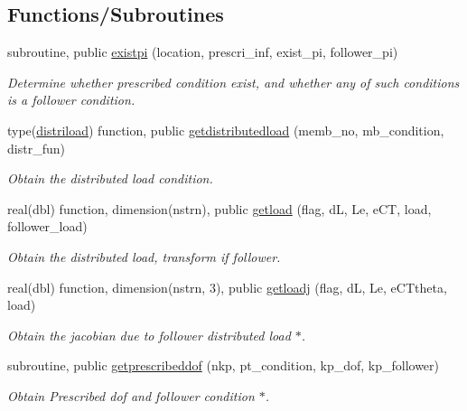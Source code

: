 \subsection*{Functions/\+Subroutines}
\begin{DoxyCompactItemize}
\item 
subroutine, public \hyperlink{namespaceprescribedcondition_acb722f1fdcfebc72bc33fb3162d9db6d}{existpi} (location, prescri\+\_\+inf, exist\+\_\+pi, follower\+\_\+pi)
\begin{DoxyCompactList}\small\item\em Determine whether prescribed condition exist, and whether any of such conditions is a follower condition. \end{DoxyCompactList}\item 
type(\hyperlink{structprescribedcondition_1_1distriload}{distriload}) function, public \hyperlink{namespaceprescribedcondition_a3f553c3c92903ed635511b07840774ff}{getdistributedload} (memb\+\_\+no, mb\+\_\+condition, distr\+\_\+fun)
\begin{DoxyCompactList}\small\item\em Obtain the distributed load condition. \end{DoxyCompactList}\item 
real(dbl) function, dimension(nstrn), public \hyperlink{namespaceprescribedcondition_a6f624d814d4a2927fd9cc778231e6840}{getload} (flag, dL, Le, e\+CT, load, follower\+\_\+load)
\begin{DoxyCompactList}\small\item\em Obtain the distributed load, transform if follower. \end{DoxyCompactList}\item 
real(dbl) function, dimension(nstrn, 3), public \hyperlink{namespaceprescribedcondition_aa1915c03ae6332a4fa577bcbc8ca2a68}{getloadj} (flag, dL, Le, e\+C\+Ttheta, load)
\begin{DoxyCompactList}\small\item\em Obtain the jacobian due to follower distributed load $\ast$. \end{DoxyCompactList}\item 
subroutine, public \hyperlink{namespaceprescribedcondition_a88f45dfc44f37db180ed595e112a2a36}{getprescribeddof} (nkp, pt\+\_\+condition, kp\+\_\+dof, kp\+\_\+follower)
\begin{DoxyCompactList}\small\item\em Obtain Prescribed dof and follower condition $\ast$. \end{DoxyCompactList}\item 

\end{DoxyCompactItemize}
